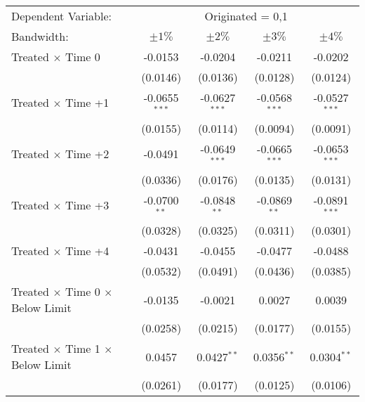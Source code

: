 \begin{tabular*}{0.8\textwidth}{@{\extracolsep{\fill}}lcccc}
   \toprule
   Dependent Variable: & \multicolumn{4}{c}{Originated = 0,1}\\
   Bandwidth:                                          & $\pm1\%$            & $\pm2\%$            & $\pm3\%$            & $\pm4\%$  \\  
   \midrule
    Treated $\times$ Time 0                         & -0.0153         & -0.0204         & -0.0211         & -0.0202\\   
                                                    & (0.0146)        & (0.0136)        & (0.0128)        & (0.0124)\\   
    Treated $\times$ Time +1                        & -0.0655$^{***}$ & -0.0627$^{***}$ & -0.0568$^{***}$ & -0.0527$^{***}$\\   
                                                    & (0.0155)        & (0.0114)        & (0.0094)        & (0.0091)\\   
    Treated $\times$ Time +2                        & -0.0491         & -0.0649$^{***}$ & -0.0665$^{***}$ & -0.0653$^{***}$\\   
                                                    & (0.0336)        & (0.0176)        & (0.0135)        & (0.0131)\\   
    Treated $\times$ Time +3                        & -0.0700$^{**}$  & -0.0848$^{**}$  & -0.0869$^{**}$  & -0.0891$^{***}$\\   
                                                    & (0.0328)        & (0.0325)        & (0.0311)        & (0.0301)\\   
    Treated $\times$ Time +4                        & -0.0431         & -0.0455         & -0.0477         & -0.0488\\   
                                                    & (0.0532)        & (0.0491)        & (0.0436)        & (0.0385)\\
   Treated $\times$ Time 0 $\times$ Below Limit     & -0.0135         & -0.0021         & 0.0027          & 0.0039\\   
                                                    & (0.0258)        & (0.0215)        & (0.0177)        & (0.0155)\\   
   Treated $\times$ Time 1 $\times$ Below Limit     & 0.0457          & 0.0427$^{**}$   & 0.0356$^{**}$   & 0.0304$^{**}$\\   
                                                    & (0.0261)        & (0.0177)        & (0.0125)        & (0.0106)\\   

\end{tabular*}
